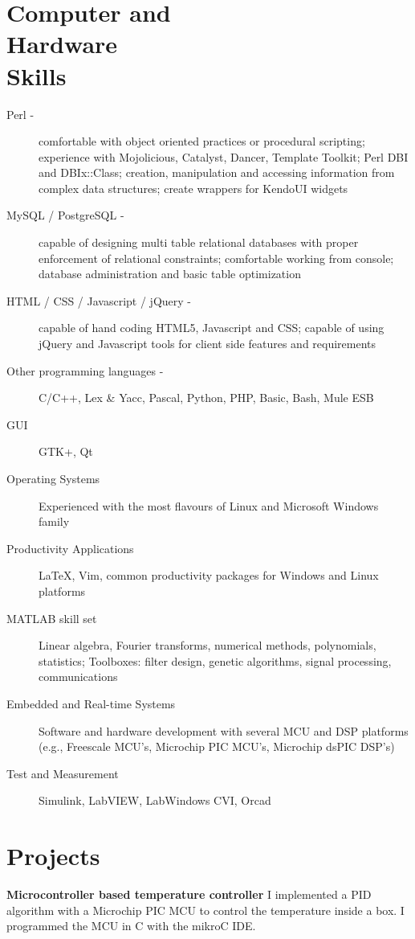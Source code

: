 \documentclass[margin,line,a4paper]{resume}
\begin{document}
\begin{resume}
\section{\mysidestyle Computer and\\Hardware\\Skills}
	\begin{description}
		\item[Perl -] comfortable with object oriented practices or procedural scripting; experience with Mojolicious, Catalyst, Dancer, Template Toolkit; Perl DBI and DBIx::Class; creation, manipulation and accessing information from
complex data structures; create wrappers for KendoUI widgets
		\item[MySQL / PostgreSQL -] capable of designing multi table relational
databases with proper enforcement of relational constraints; comfortable
working from console; database administration and basic table optimization
		\item[HTML / CSS / Javascript / jQuery -] capable of hand coding HTML5,
Javascript and CSS; capable of using jQuery and Javascript tools for client
side features and requirements
		\item[Other programming languages -] C/C++, Lex \& Yacc, Pascal, Python, PHP, Basic, Bash, Mule ESB
		\item[GUI] GTK+, Qt
		\item[Operating Systems] Experienced with the most flavours of Linux and Microsoft Windows family
		\item[Productivity Applications] LaTeX, Vim, common productivity packages for Windows and Linux platforms
		\item[MATLAB skill set] Linear algebra, Fourier transforms, numerical methods, polynomials, statistics; Toolboxes: filter design, genetic algorithms, signal processing, communications
		\item[Embedded and Real-time Systems] Software and hardware development with several MCU and DSP platforms (e.g., Freescale MCU's, Microchip PIC MCU's, Microchip dsPIC DSP's)
		\item[Test and Measurement] Simulink, LabVIEW, LabWindows CVI, Orcad
	
	\end{description}

\section{\mysidestyle Projects}
	\textbf{Microcontroller based temperature controller} I implemented a PID algorithm with a Microchip PIC MCU to control the temperature inside a box. I programmed the MCU in C with the mikroC IDE.
	

\end{resume}
\end{document}
